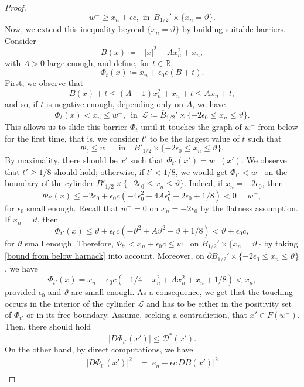 \documentclass[reqno,11pt]{amsart}
\newcommand{\1}{\mathds{1}}
\numberwithin{equation}{section}
\begin{document}
\begin{proof}
\begin{equation}
	w^- \geq x_n + \epsilon c, \text{ in }\, B_{1/2}' \times \{x_n = \vartheta\}.
\end{equation}
Now, we extend this inequality beyond $\{x_n = \vartheta\}$ by building suitable barriers. Consider
$$
    B(x) \coloneqq -|x|^2 + Ax_n^2 + x_n, 
$$
with $A>0$ large enough, and define, for $t \in \mathbb{R}$,
$$
    \Phi_t(x) \coloneqq x_n + \epsilon_0 c(B+t).
$$
First, we observe that
$$
	B(x) + t \leq (A-1)x_n^2 + x_n + t \leq Ax_n + t,
$$
and so, if $t$ is negative enough, depending only on $A$, we have
$$
	\Phi_t(x) < x_n \leq w^-,\, \text{ in }\, \mathcal{L} \coloneqq \overline{B}_{1/2}' \times \{-2\epsilon_0 \leq x_n \leq \vartheta\}.
$$
This allows us to slide this barrier $\Phi_t$ until it touches the graph of $w^-$ from below for the first time, that is, we consider $t'$ to be the largest value of $t$ such that
$$
    \Phi_t \leq w^- \quad \text{in} \quad B'_{1/2} \times \{-2\epsilon_0 \leq x_n \leq \vartheta\}.
$$
By maximality, there should be $x'$ such that $\Phi_{t'}(x') = w^-(x')$. We observe that $t' \geq 1/8$ should hold; otherwise, if $t' < 1/8$, we would get $\Phi_{t'} < w^-$ on the boundary of the cylinder $B'_{1/2} \times \{-2\epsilon_0 \leq x_n \leq \vartheta\}$. Indeed, if $x_n = -2\epsilon_0$, then
$$
	\Phi_{t'}(x) \leq -2\epsilon_0 + \epsilon_0 c\left(-4\epsilon_0^2 + 4A\epsilon_0^2 - 2\epsilon_0 + 1/8\right) < 0 = w^-,
$$
for $\epsilon_0$ small enough. Recall that $w^-=0$ on $x_n = -2\epsilon_0$ by the flatness assumption. If $x_n = \vartheta$, then
$$
	\Phi_{t'}(x) \leq \vartheta + \epsilon_0 c\left(-\vartheta^2 + A\vartheta^2 - \vartheta + 1/8\right) < \vartheta + \epsilon_0 c,
$$
for $\vartheta$ small enough. Therefore, $\Phi_{t'} < x_n + \epsilon_0 c \leq w^-$ on $B_{1/2}' \times \{x_n = \vartheta\}$ by taking \eqref{bound from below harnack} into account. Moreover, on $\partial B_{1/2}' \times \{-2\epsilon_0 \leq x_n \leq \vartheta\}$, we have
$$
	\Phi_{t'}(x) = x_n + \epsilon_0 c\left(-1/4 - x_n^2 + Ax_n^2 + x_n + 1/8\right) < x_n,
$$
provided $\epsilon_0$ and $\vartheta$ are small enough. As a consequence, we get that the touching occurs in the interior of the cylinder $\mathcal{L}$ and has to be either in the positivity set of $\Phi_{t'}$ or in its free boundary. Assume, seeking a contradiction, that $x' \in F(w^-)$. Then, there should hold
$$
    |D\Phi_{t'}(x')| \leq \mathcal{D}^\ast(x').
$$
On the other hand, by direct computations, we have
\begin{align}
\nonumber |D\Phi_{t'}(x')|^2
  &= \bigl| e_n + \epsilon c\, DB(x') \bigr|^2 \\ \nonumber

\end{align}
\end{proof}
\end{document}
